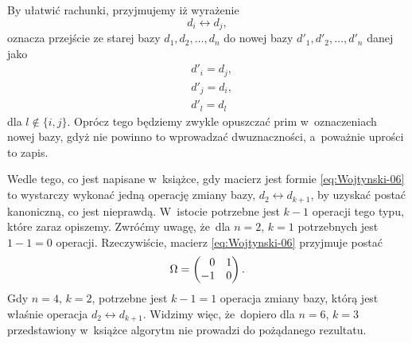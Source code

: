\documentclass[a4paper,11pt]{article}
\begin{document}
By ułatwić rachunki, przyjmujemy iż wyrażenie
\begin{equation}
  \label{eq:Wojtynski-14}
  d_{ i } \leftrightarrow d_{ j },
\end{equation}
oznacza przejście ze starej bazy $d_{ 1 }, d_{ 2 }, \ldots, d_{ n }$ do nowej bazy
$d'_{ 1 }, d'_{ 2 }, \ldots, d'_{ n }$ danej jako
\begin{subequations}
  \begin{align}
    \label{eq:Wojtynski-15-A}
    &d'_{ i } = d_{ j }, \\
    \label{eq:Wojtynski-15-B}
    &d'_{ j } = d_{ i }, \\
    \label{eq:Wojtynski-15-C}
    &d'_{ l } = d_{ l }
  \end{align}
\end{subequations}
dla $l \notin \{ i, j \}$. Oprócz tego będziemy zwykle opuszczać prim
w~oznaczeniach nowej bazy, gdyż nie powinno to wprowadzać dwuznaczności,
a~poważnie uprości to zapis.

Wedle tego, co jest napisane w~książce, gdy macierz jest formie
\eqref{eq:Wojtynski-06} to wystarczy wykonać jedną operację zmiany bazy,
$d_{ 2 } \leftrightarrow d_{ k + 1 }$, by uzyskać postać kanoniczną, co jest nieprawdą.
W~istocie potrzebne jest $k - 1$ operacji tego typu, które zaraz opiszemy.
Zwróćmy uwagę, że~dla $n = 2$, $k = 1$ potrzebnych jest $1 - 1 = 0$
operacji. Rzeczywiście, macierz \eqref{eq:Wojtynski-06} przyjmuje postać
\begin{equation}
  \label{eq:Wojtynski-16}
  \Omega =
  \begin{pmatrix}
    \hphantom{-} 0 & 1 \\
    -1 & 0
  \end{pmatrix}.
\end{equation}
Gdy $n = 4$, $k = 2$, potrzebne jest $k - 1 = 1$ operacja zmiany bazy,
którą jest właśnie operacja $d_{ 2 } \leftrightarrow d_{ k + 1 }$. Widzimy więc, że~dopiero
dla $n = 6$, $k = 3$ przedstawiony w~książce algorytm nie prowadzi
do pożądanego rezultatu.
\end{document}
